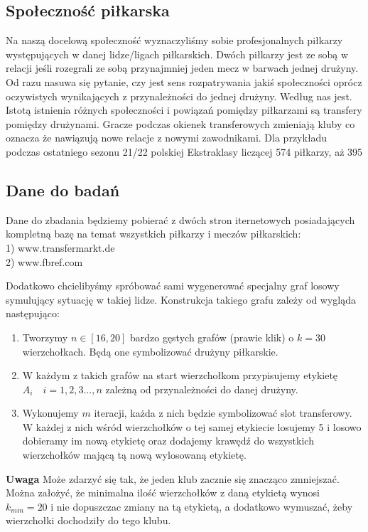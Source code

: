 \documentclass{article}
\begin{document}
\subsection{Społeczność piłkarska}
Na naszą docelową społeczność wyznaczyliśmy sobie profesjonalnych piłkarzy występujących w danej lidze/ligach piłkarskich. Dwóch piłkarzy jest ze sobą w relacji jeśli rozegrali ze sobą przynajmniej jeden mecz w barwach jednej drużyny.
Od razu nasuwa się pytanie, czy jest sens rozpatrywania jakiś społeczności oprócz oczywistych wynikających z przynależności do jednej drużyny. Według nas jest. Istotą istnienia różnych społeczności i powiązań pomiędzy piłkarzami są transfery pomiędzy drużynami. Gracze podczas okienek transferowych zmieniają kluby co oznacza że nawiązują nowe relacje z nowymi zawodnikami. Dla przykładu podczas ostatniego sezonu 21/22 polskiej Ekstraklasy liczącej 574 piłkarzy, aż 395 

\subsection{Dane do badań}
Dane do zbadania będziemy pobierać z dwóch stron iternetowych posiadających kompletną bazę na temat wszystkich piłkarzy i meczów piłkarskich: \\
1) www.transfermarkt.de\\
2) www.fbref.com

Dodatkowo chcielibyśmy spróbować sami wygenerować specjalny graf losowy symulujący sytuację w takiej lidze. Konstrukcja takiego grafu zależy od wygląda następująco:
\begin{enumerate}
    \item Tworzymy $ n \in [16,20]$ bardzo gęstych grafów (prawie klik) o $k = 30$ wierzchołkach. Będą one symbolizować drużyny piłkarskie.
    \item W każdym z takich grafów na start wierzchołkom przypisujemy etykietę $A_i \quad i = 1,2,3...,n $  zależną od przynależności do danej drużyny.
    \item Wykonujemy $m$ iteracji, każda z nich będzie symbolizować slot transferowy. W każdej z nich wśród wierzchołków o tej samej etykiecie losujemy 5 i losowo dobieramy im nową etykietę oraz dodajemy krawędź do wszystkich wierzchołków mającą tą nową wylosowaną etykietę.
\end{enumerate}
\textbf{Uwaga} Może zdarzyć się tak, że jeden klub zacznie się znacząco zmniejszać. Można założyć, że minimalna ilość wierzchołków z daną etykietą wynosi $k_{min} = 20$ i nie dopuszczac zmiany na tą etykietą, a dodatkowo wymuszać, żeby wierzchołki dochodziły do tego klubu.
\end{document}
